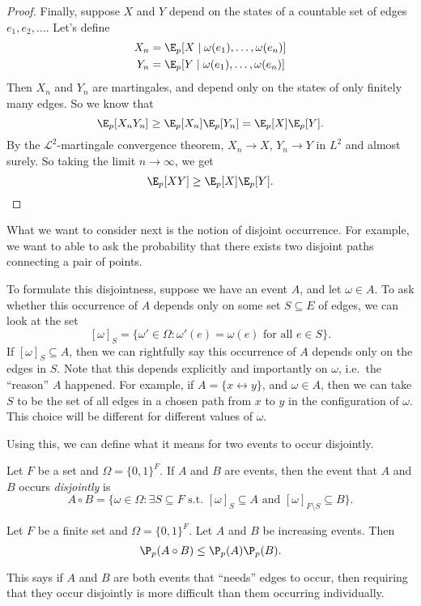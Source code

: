 \documentclass[a4paper]{article}
\begin{document}
\begin{proof}
  Finally, suppose $X$ and $Y$ depend on the states of a countable set of edges $e_1, e_2, \ldots$. Let's define
  \begin{align*}
    X_n &= \E_p [X \mid \omega(e_1), \ldots, \omega(e_n)]\\
    Y_n &= \E_p [Y \mid \omega(e_1), \ldots, \omega(e_n)]
  \end{align*}
  Then $X_n$ and $Y_n$ are martingales, and depend only on the states of only finitely many edges. So we know that
  \[
    \E_p[X_n Y_n] \geq \E_p [X_n] \E_p[Y_n] = \E_p[X] \E_p[Y].
  \]
  By the $\mathcal{L}^2$-martingale convergence theorem, $X_n \to X$, $Y_n \to Y$ in $L^2$ and almost surely. So taking the limit $n \to \infty$, we get
  \[
    \E_p[XY] \geq \E_p[X] \E_p[Y].
  \]
\end{proof}

What we want to consider next is the notion of disjoint occurrence. For example, we want to able to ask the probability that there exists two disjoint paths connecting a pair of points.

To formulate this disjointness, suppose we have an event $A$, and let $\omega \in A$. To ask whether this occurrence of $A$ depends only on some set $S \subseteq E$ of edges, we can look at the set
\[
  [\omega]_S = \{\omega' \in \Omega: \omega'(e) = \omega(e)\text{ for all }e \in S\}.
\]
If $[\omega]_S \subseteq A$, then we can rightfully say this occurrence of $A$ depends only on the edges in $S$. Note that this depends explicitly and importantly on $\omega$, i.e.\ the ``reason'' $A$ happened. For example, if $A = \{x \leftrightarrow y\}$, and $\omega \in A$, then we can take $S$ to be the set of all edges in a chosen path from $x$ to $y$ in the configuration of $\omega$. This choice will be different for different values of $\omega$.

Using this, we can define what it means for two events to occur disjointly.
\begin{defi}
  Let $F$ be a set and $\Omega = \{0, 1\}^F$. If $A$ and $B$ are events, then the event that $A$ and $B$ occurs \emph{disjointly} is
  \[
    A \circ B = \{\omega \in \Omega : \exists S \subseteq F\text{ s.t. } [\omega]_S \subseteq A \text{ and } [\omega]_{F\setminus S} \subseteq B\}.
  \]
\end{defi}

\begin{thm}[BK inequality] %
  Let $F$ be a finite set and $\Omega = \{0, 1\}^F$. Let $A$ and $B$ be increasing events. Then
  \[
    \P_p(A \circ B) \leq \P_p(A) \P_p(B).
  \]
\end{thm}
This says if $A$ and $B$ are both events that ``needs'' edges to occur, then requiring that they occur disjointly is more difficult than them occurring individually.
\end{document}
